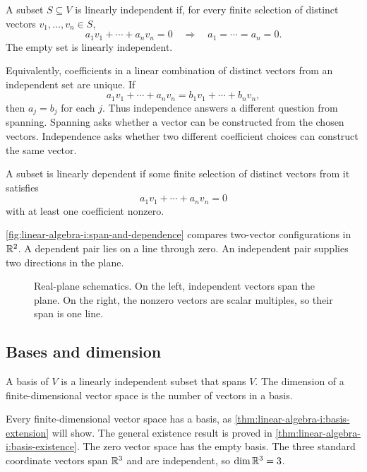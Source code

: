 \begin{definition}
  A subset \(S\subseteq V\) is linearly independent if, for every finite
  selection of distinct vectors \(v_1,\ldots,v_n\in S\),
  \[
    a_1v_1+\cdots+a_nv_n=0
    \quad\Longrightarrow\quad
    a_1=\cdots=a_n=0.
  \]
  The empty set is linearly independent.
\end{definition}

Equivalently, coefficients in a linear combination of distinct vectors from
an independent set are unique. If
\[
  a_1v_1+\cdots+a_nv_n=b_1v_1+\cdots+b_nv_n,
\]
then \(a_j=b_j\) for each \(j\).
Thus independence answers a different question from spanning. Spanning asks
whether a vector can be constructed from the chosen vectors. Independence
asks whether two different coefficient choices can construct the same vector.

\begin{definition}
  A subset is linearly dependent if some finite selection of distinct
  vectors from it satisfies
  \[
    a_1v_1+\cdots+a_nv_n=0
  \]
  with at least one coefficient nonzero.
\end{definition}

\autoref{fig:linear-algebra-i:span-and-dependence} compares two-vector
configurations in \(\mathbb{R}^2\). A dependent pair lies on a line through zero.
An independent pair supplies two directions in the plane.
\begin{figure}[htbp]
  \centering
  
  \caption[Span of two vectors]{Real-plane schematics. On the left,
    independent vectors span the plane. On the right, the nonzero vectors
    are scalar multiples, so their span is one line.}
  \label{fig:linear-algebra-i:span-and-dependence}
\end{figure}

\subsection{Bases and dimension}

\begin{definition}
  A basis of \(V\) is a linearly independent subset that spans \(V\).
  The dimension of a finite-dimensional vector space is the number of
  vectors in a basis.
\end{definition}

Every finite-dimensional vector space has a basis, as
\autoref{thm:linear-algebra-i:basis-extension} will show. The general
existence result is proved in \autoref{thm:linear-algebra-i:basis-existence}.
The zero vector space has the empty basis. The three standard coordinate
vectors span \(\mathbb{R}^3\) and are independent, so \(\dim\mathbb{R}^3=3\).

